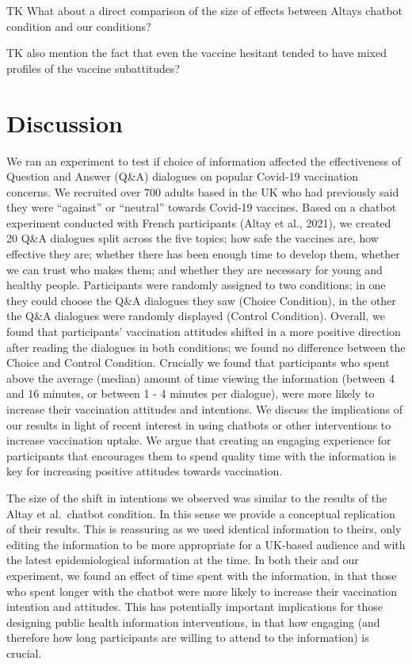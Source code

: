 \documentclass[english,,jou,floatsintext]{apa6}
\begin{document}
TK What about a direct comparison of the size of effects between Altays chatbot condition and our conditions?

TK also mention the fact that even the vaccine hesitant tended to have mixed profiles of the vaccine subattitudes?

\hypertarget{discussion}{%
\section{Discussion}\label{discussion}}

We ran an experiment to test if choice of information affected the effectiveness of Question and Answer (Q\&A) dialogues on popular Covid-19 vaccination concerns. We recruited over 700 adults based in the UK who had previously said they were \enquote{against} or \enquote{neutral} towards Covid-19 vaccines. Based on a chatbot experiment conducted with French participants (Altay et al., 2021), we created 20 Q\&A dialogues split across the five topics; how safe the vaccines are, how effective they are; whether there has been enough time to develop them, whether we can trust who makes them; and whether they are necessary for young and healthy people. Participants were randomly assigned to two conditions; in one they could choose the Q\&A dialogues they saw (Choice Condition), in the other the Q\&A dialogues were randomly displayed (Control Condition). Overall, we found that participants' vaccination attitudes shifted in a more positive direction after reading the dialogues in both conditions; we found no difference between the Choice and Control Condition. Crucially we found that participants who spent above the average (median) amount of time viewing the information (between 4 and 16 minutes, or between 1 - 4 minutes per dialogue), were more likely to increase their vaccination attitudes and intentions. We discuss the implications of our results in light of recent interest in using chatbots or other interventions to increase vaccination uptake. We argue that creating an engaging experience for participants that encourages them to spend quality time with the information is key for increasing positive attitudes towards vaccination.

The size of the shift in intentions we observed was similar to the results of the Altay et al.~chatbot condition. In this sense we provide a conceptual replication of their results. This is reassuring as we used identical information to theirs, only editing the information to be more appropriate for a UK-based audience and with the latest epidemiological information at the time. In both their and our experiment, we found an effect of time spent with the information, in that those who spent longer with the chatbot were more likely to increase their vaccination intention and attitudes. This has potentially important implications for those designing public health information interventions, in that how engaging (and therefore how long participants are willing to attend to the information) is crucial.
\end{document}
